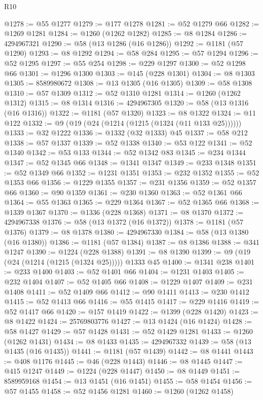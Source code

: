\begin{lexlean}{R10}
\begin{coremodule}
@1278 := @55 @1277
@1279 := @177 @1278
@1281 := @52 @1279 @66
@1282 := @1269 @1281
@1284 := @1260 (@1262 @1282)
@1285 := @8 @1284
@1286 := 4294967321
@1290 := @58 (@13 @1286 (@16 @1286))
@1292 := @1181 (@57 @1290)
@1293 := @8 @1292
@1294 := @58 @284
@1295 := @57 @1294
@1296 := @52 @1295
@1297 := @55 @254
@1298 := @229 @1297
@1300 := @52 @1298 @66
@1301 := @1296 @1300
@1303 := @145 (@228 @1301)
@1304 := @8 @1303
@1305 := 8589980672
@1308 := @13 @1305 (@16 @1305)
@1309 := @58 @1308
@1310 := @57 @1309
@1312 := @52 @1310 @1281
@1314 := @1260 (@1262 @1312)
@1315 := @8 @1314
@1316 := 4294967305
@1320 := @58 (@13 @1316 (@16 @1316))
@1322 := @1181 (@57 @1320)
@1323 := @8 @1322
@1324 := @11 @122
@1332 := @9 (@19 (@24 (@1214 (@1215 (@1324 (@11 @133 @25))))))
@1333 := @32 @1222
@1336 := @1332 (@32 @1333) @45
@1337 := @58 @212
@1338 := @57 @1337
@1339 := @52 @1338
@1340 := @53 @122
@1341 := @52 @1340
@1342 := @53 @133
@1344 := @52 @1342 @83
@1345 := @234 @1344
@1347 := @52 @1345 @66
@1348 := @1341 @1347
@1349 := @233 @1348
@1351 := @52 @1349 @66
@1352 := @1231 @1351
@1353 := @232 @1352
@1355 := @52 @1353 @66
@1356 := @1229 @1355
@1357 := @231 @1356
@1359 := @52 @1357 @66
@1360 := @90 @1359
@1361 := @230 @1360
@1363 := @52 @1361 @66
@1364 := @55 @1363
@1365 := @229 @1364
@1367 := @52 @1365 @66
@1368 := @1339 @1367
@1370 := @1336 (@228 @1368)
@1371 := @8 @1370
@1372 := 4294967338
@1376 := @58 (@13 @1372 (@16 @1372))
@1378 := @1181 (@57 @1376)
@1379 := @8 @1378
@1380 := 4294967330
@1384 := @58 (@13 @1380 (@16 @1380))
@1386 := @1181 (@57 @1384)
@1387 := @8 @1386
@1388 := @341 @1247
@1390 := @1224 (@228 @1388)
@1391 := @8 @1390
@1399 := @9 (@19 (@24 (@1214 (@1215 (@1324 @25))))) @1333 @45
@1400 := @1341 @238
@1401 := @233 @1400
@1403 := @52 @1401 @66
@1404 := @1231 @1403
@1405 := @232 @1404
@1407 := @52 @1405 @66
@1408 := @1229 @1407
@1409 := @231 @1408
@1411 := @52 @1409 @66
@1412 := @90 @1411
@1413 := @230 @1412
@1415 := @52 @1413 @66
@1416 := @55 @1415
@1417 := @229 @1416
@1419 := @52 @1417 @66
@1420 := @157 @1419
@1422 := @1399 (@228 @1420)
@1423 := @8 @1422
@1424 := 25769803776
@1427 := @13 @1424 (@16 @1424)
@1428 := @58 @1427
@1429 := @57 @1428
@1431 := @52 @1429 @1281
@1433 := @1260 (@1262 @1431)
@1434 := @8 @1433
@1435 := 4294967332
@1439 := @58 (@13 @1435 (@16 @1435))
@1441 := @1181 (@57 @1439)
@1442 := @8 @1441
@1443 := @408 @1176
@1445 := @46 (@228 @1443)
@1446 := @8 @1445
@1447 := @415 @1247
@1449 := @1224 (@228 @1447)
@1450 := @8 @1449
@1451 := 8589959168
@1454 := @13 @1451 (@16 @1451)
@1455 := @58 @1454
@1456 := @57 @1455
@1458 := @52 @1456 @1281
@1460 := @1260 (@1262 @1458)

\end{coremodule}
\end{lexlean}
